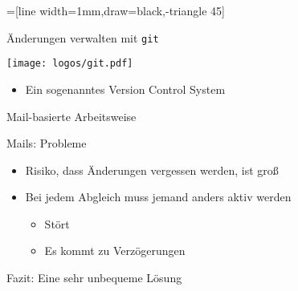 \newcommand{\mail}{\texttt{[image: figures/mail.pdf]}}
=[line width=1mm,draw=black,-triangle 45]

\begin{frame}
  \centering
  \Huge Änderungen verwalten mit \texttt{git}
\end{frame}

\begin{frame}
    \centering
    \texttt{[image: logos/git.pdf]}
    
    \vspace{1em}

    \begin{itemize}
      \item Ein sogenanntes Version Control System
    \end{itemize}
\end{frame}

\begin{frame}{Mail-basierte Arbeitsweise}
  \centering
\end{frame}

\begin{frame}{Mails: Probleme}
  \begin{itemize}
    \item Risiko, dass Änderungen vergessen werden, ist groß
    \item Bei jedem Abgleich muss jemand anders aktiv werden
      \begin{itemize}
        \item Stört
        \item Es kommt zu Verzögerungen
      \end{itemize}
  \end{itemize}
  Fazit: Eine sehr unbequeme Lösung
\end{frame}

